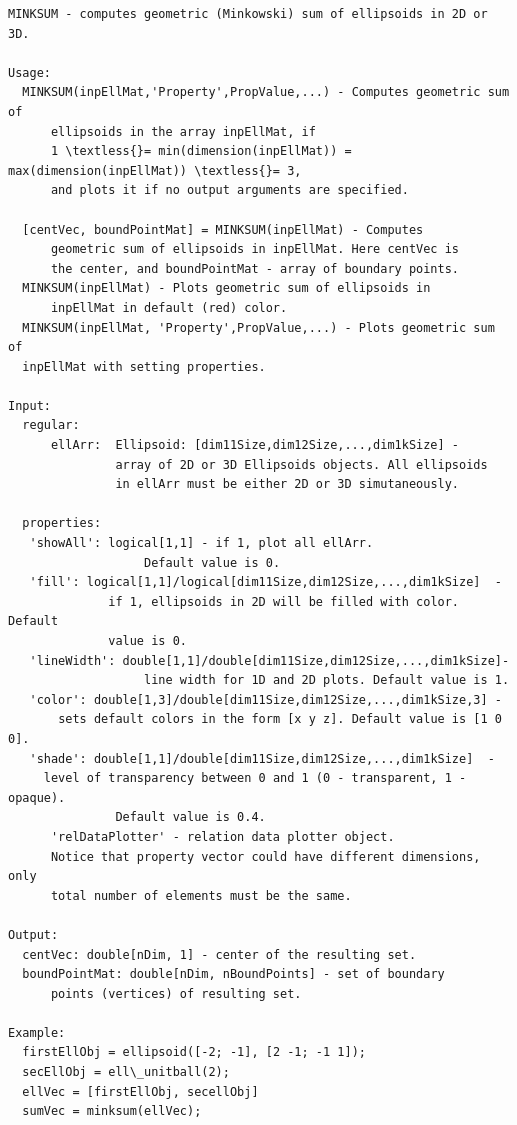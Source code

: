 \documentclass[letterpaper,10pt,english]{sphinxmanual}
\begin{document}
\begin{Verbatim}[commandchars=\\\{\}]
MINKSUM - computes geometric (Minkowski) sum of ellipsoids in 2D or 3D.

Usage:
  MINKSUM(inpEllMat,'Property',PropValue,...) - Computes geometric sum of
      ellipsoids in the array inpEllMat, if
      1 \textless{}= min(dimension(inpEllMat)) = max(dimension(inpEllMat)) \textless{}= 3,
      and plots it if no output arguments are specified.

  [centVec, boundPointMat] = MINKSUM(inpEllMat) - Computes
      geometric sum of ellipsoids in inpEllMat. Here centVec is
      the center, and boundPointMat - array of boundary points.
  MINKSUM(inpEllMat) - Plots geometric sum of ellipsoids in
      inpEllMat in default (red) color.
  MINKSUM(inpEllMat, 'Property',PropValue,...) - Plots geometric sum of
  inpEllMat with setting properties.

Input:
  regular:
      ellArr:  Ellipsoid: [dim11Size,dim12Size,...,dim1kSize] -
               array of 2D or 3D Ellipsoids objects. All ellipsoids
               in ellArr must be either 2D or 3D simutaneously.

  properties:
   'showAll': logical[1,1] - if 1, plot all ellArr.
                   Default value is 0.
   'fill': logical[1,1]/logical[dim11Size,dim12Size,...,dim1kSize]  -
              if 1, ellipsoids in 2D will be filled with color. Default
              value is 0.
   'lineWidth': double[1,1]/double[dim11Size,dim12Size,...,dim1kSize]-
                   line width for 1D and 2D plots. Default value is 1.
   'color': double[1,3]/double[dim11Size,dim12Size,...,dim1kSize,3] -
       sets default colors in the form [x y z]. Default value is [1 0 0].
   'shade': double[1,1]/double[dim11Size,dim12Size,...,dim1kSize]  -
     level of transparency between 0 and 1 (0 - transparent, 1 - opaque).
               Default value is 0.4.
      'relDataPlotter' - relation data plotter object.
      Notice that property vector could have different dimensions, only
      total number of elements must be the same.

Output:
  centVec: double[nDim, 1] - center of the resulting set.
  boundPointMat: double[nDim, nBoundPoints] - set of boundary
      points (vertices) of resulting set.

Example:
  firstEllObj = ellipsoid([-2; -1], [2 -1; -1 1]);
  secEllObj = ell\_unitball(2);
  ellVec = [firstEllObj, secellObj]
  sumVec = minksum(ellVec);
\end{Verbatim}
\end{document}
